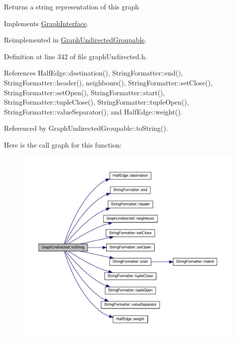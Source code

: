 \begin{DoxyReturn}{Returns}
a string representation of this graph 
\end{DoxyReturn}


Implements \hyperlink{classGraphInterface_ac6d3da524ca5c95c3ebd80d2b0d5d762}{Graph\+Interface}.



Reimplemented in \hyperlink{classGraphUndirectedGroupable_a615f30036acfdd33e45b82dc47e7d174}{Graph\+Undirected\+Groupable}.



Definition at line 342 of file graph\+Undirected.\+h.



References Half\+Edge\+::destination(), String\+Formatter\+::end(), String\+Formatter\+::header(), neighbours(), String\+Formatter\+::set\+Close(), String\+Formatter\+::set\+Open(), String\+Formatter\+::start(), String\+Formatter\+::tuple\+Close(), String\+Formatter\+::tuple\+Open(), String\+Formatter\+::value\+Separator(), and Half\+Edge\+::weight().



Referenced by Graph\+Undirected\+Groupable\+::to\+String().

Here is the call graph for this function\+:
\nopagebreak
\begin{figure}[H]
\begin{center}
\leavevmode
\includegraphics[width=350pt]{classGraphUndirected_a61604a0840f044d52a2762f44635fa9c_cgraph}
\end{center}
\end{figure}
\mbox{\label{classGraphUndirected_a41ba96531c669461dbc7e11ee35796ab}} 
